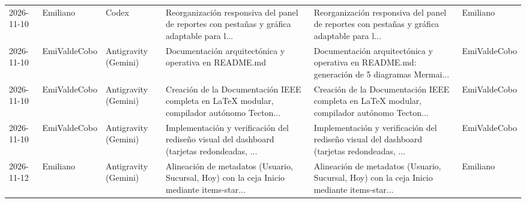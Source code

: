 \begin{table}[htbp]
\begin{tabularx}{\textwidth}{llllXX}
2026-11-10 & Emiliano & Codex & Reorganización responsiva del panel de reportes con pestañas y gráfica adaptable para l... & Reorganización responsiva del panel de reportes con pestañas y gráfica adaptable para l... & Emiliano \\
2026-11-10 & EmiValdeCobo & Antigravity (Gemini) & Documentación arquitectónica y operativa en README.md & Documentación arquitectónica y operativa en README.md: generación de 5 diagramas Mermai... & EmiValdeCobo \\
2026-11-10 & EmiValdeCobo & Antigravity (Gemini) & Creación de la Documentación IEEE completa en LaTeX modular, compilador autónomo Tecton... & Creación de la Documentación IEEE completa en LaTeX modular, compilador autónomo Tecton... & EmiValdeCobo \\
2026-11-10 & EmiValdeCobo & Antigravity (Gemini) & Implementación y verificación del rediseño visual del dashboard (tarjetas redondeadas, ... & Implementación y verificación del rediseño visual del dashboard (tarjetas redondeadas, ... & EmiValdeCobo \\
2026-11-12 & Emiliano & Antigravity (Gemini) & Alineación de metadatos (Usuario, Sucursal, Hoy) con la ceja Inicio mediante items-star... & Alineación de metadatos (Usuario, Sucursal, Hoy) con la ceja Inicio mediante items-star... & Emiliano \\
\bottomrule
\end{tabularx}
\end{table}
